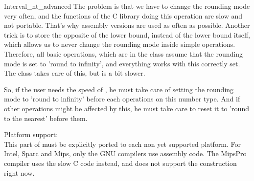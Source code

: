 \begin{ccAdvanced}
\begin{ccClass} {Interval_nt_advanced}
The problem is that we have to change the rounding mode very often, and the
functions of the C library doing this operation are slow and not portable.
That's why assembly versions are used as often as possible.
Another trick is to store the opposite of the lower bound, instead of the
lower bound itself, which allows us to never change the rounding mode inside
simple operations.  Therefore, all basic operations, which are in the class 
 assume that the rounding mode is set to 
'round to infinity', and everything works with this correctly set.  
The class  takes care of this, but is a bit slower.

So, if the user needs the speed of , he must
take care of setting the rounding mode to 'round to infinity' before each
operations on this number type.  And if other operations might be affected by
this, he must take care to reset it to 'round to the nearest' before them.


Platform support:\\
This part of {\cgal} must be explicitly ported to each non yet supported
platform.  For Intel, Sparc and Mips, only the GNU compilers use assembly
code.  The MipsPro compiler uses the slow C code instead, and does not
support the construction  right now.

\end{ccClass}

\end{ccAdvanced}


